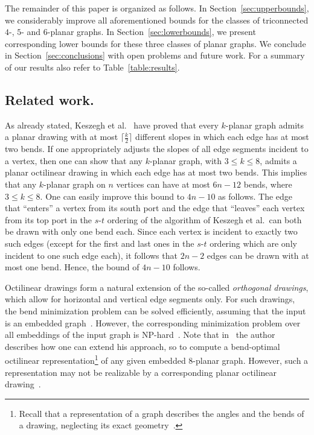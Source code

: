 \documentclass[a4paper,twoside,11pt]{article}
\begin{document}
The remainder of this paper is organized as follows. In
Section~\ref{sec:upperbounds}, we considerably improve all
aforementioned bounds for the classes of triconnected $4$-, $5$- and
$6$-planar graphs. In Section~\ref{sec:lowerbounds}, we present
corresponding lower bounds for these three classes of planar graphs.
We conclude in Section~\ref{sec:conclusions} with open problems and
future work. For a summary of our results also refer to
Table~\ref{table:results}.


\subsection{Related work.}
\label{sec:relatedwork}
As already stated, Keszegh et al.~\cite{KPP13} have proved that
every $k$-planar graph admits a planar drawing with at most
$\lceil\frac{k}{2}\rceil$ different slopes in which each edge has at
most two bends. If one appropriately adjusts the slopes of all edge
segments incident to a vertex, then one can show that any $k$-planar
graph, with $3 \leq k \leq 8$, admits a planar octilinear drawing in
which each edge has at most two bends. This implies that any
$k$-planar graph on $n$ vertices can have at most $6n-12$ bends,
where $3 \leq k \leq 8$. One can easily improve this bound to
$4n-10$ as follows. The edge that ``enters'' a vertex from its south
port and the edge that ``leaves'' each vertex from its top port in
the $s$-$t$ ordering of the algorithm of Keszegh et al.~can both be
drawn with only one bend each. Since each vertex is incident to
exactly two such edges (except for the first and last ones in the
$s$-$t$ ordering which are only incident to one such edge each), it
follows that $2n-2$ edges can be drawn with at most one bend. Hence,
the bound of $4n-10$ follows.

Octilinear drawings form a natural extension of the so-called
\emph{orthogonal drawings}, which allow for horizontal and vertical
edge segments only. For such drawings, the bend minimization problem
can be solved efficiently, assuming that the input is an embedded
graph~\cite{Tamassia87}. However, the corresponding minimization
problem over all embeddings of the input graph is
NP-hard~\cite{GT01}. Note that in~\cite{Tamassia87} the author
describes how one can extend his approach, so to compute a
bend-optimal octilinear representation\footnote{Recall that a
representation of a graph describes the angles and the bends of a
drawing, neglecting its exact geometry~\cite{Tamassia87}.} of any
given embedded $8$-planar graph. However, such a representation may
not be realizable by a corresponding planar octilinear
drawing~\cite{BT04}.
\end{document}
